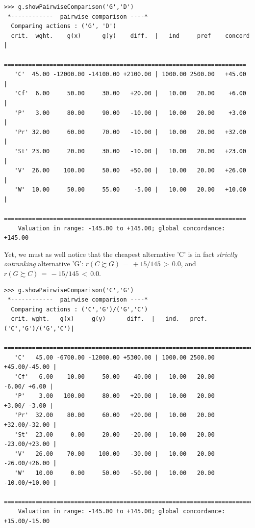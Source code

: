 \begin{lstlisting}[caption={Inspecting pairwise comparisons},label=list:6.5]
>>> g.showPairwiseComparison('G','D')
 *------------  pairwise comparison ----*
  Comparing actions : ('G', 'D')
  crit.  wght.    g(x)      g(y)    diff.  |   ind     pref    concord 	|
   =====================================================================
   'C'  45.00 -12000.00 -14100.00 +2100.00 | 1000.00 2500.00   +45.00 	| 
   'Cf'  6.00     50.00     30.00   +20.00 |   10.00   20.00    +6.00 	| 
   'P'   3.00     80.00     90.00   -10.00 |   10.00   20.00    +3.00 	| 
   'Pr' 32.00     60.00     70.00   -10.00 |   10.00   20.00   +32.00 	| 
   'St' 23.00     20.00     30.00   -10.00 |   10.00   20.00   +23.00 	| 
   'V'  26.00    100.00     50.00   +50.00 |   10.00   20.00   +26.00 	| 
   'W'  10.00     50.00     55.00    -5.00 |   10.00   20.00   +10.00 	|
   =====================================================================
    Valuation in range: -145.00 to +145.00; global concordance: +145.00
\end{lstlisting}

Yet, we must as well notice that the cheapest alternative 'C' is in fact \emph{strictly outranking} alternative 'G':  $r(C \succsim G)\, =\, +15/145\, >\, 0.0$, and $r(G \succsim C)\, =\, -15/145 \,<\, 0.0$.

\begin{lstlisting}
>>> g.showPairwiseComparison('C','G')
 *------------  pairwise comparison ----*
  Comparing actions : ('C','G')/('G','C')
  crit. wght.   g(x)     g(y)      diff.  |   ind.   pref. ('C','G')/('G','C')|
   ===========================================================================
   'C'   45.00 -6700.00 -12000.00 +5300.00 | 1000.00 2500.00    +45.00/-45.00 | 
   'Cf'   6.00    10.00     50.00   -40.00 |   10.00   20.00     -6.00/ +6.00 | 
   'P'    3.00   100.00     80.00   +20.00 |   10.00   20.00     +3.00/ -3.00 | 
   'Pr'  32.00    80.00     60.00   +20.00 |   10.00   20.00    +32.00/-32.00 | 
   'St'  23.00     0.00     20.00   -20.00 |   10.00   20.00    -23.00/+23.00 | 
   'V'   26.00    70.00    100.00   -30.00 |   10.00   20.00    -26.00/+26.00 | 
   'W'   10.00     0.00     50.00   -50.00 |   10.00   20.00    -10.00/+10.00 |
   ===========================================================================
    Valuation in range: -145.00 to +145.00; global concordance: +15.00/-15.00
\end{lstlisting}
  
